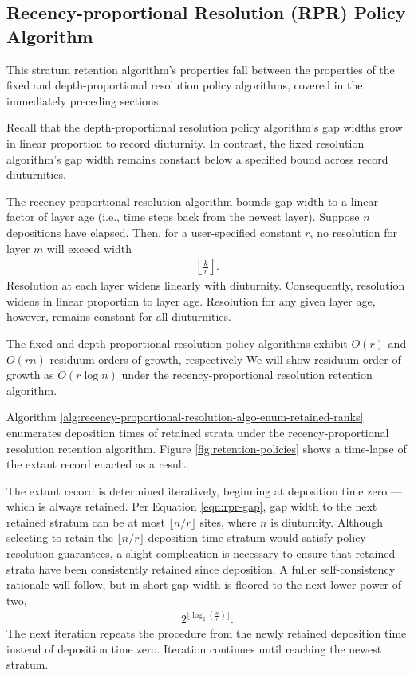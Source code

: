 \subsection{Recency-proportional Resolution (RPR) Policy Algorithm}
\label{sec:recency-proportional-resolution-algo}

This stratum retention algorithm's properties fall between the properties of the fixed and depth-proportional resolution policy algorithms, covered in the immediately preceding sections.

Recall that the depth-proportional resolution policy algorithm's gap widths grow in linear proportion to record diuturnity.
In contrast, the fixed resolution algorithm's gap width remains constant below a specified bound across record diuturnities.

The recency-proportional resolution algorithm bounds gap width to a linear factor of layer age (i.e., time steps back from the newest layer).
Suppose $n$ depositions have elapsed.
Then, for a user-specified constant $r$, no resolution for layer $m$ will exceed width
\begin{align}
  \left\lfloor \frac{k}{r} \right\rfloor.
  \label{eqn:rpr-gap}
\end{align}
Resolution at each layer widens linearly with diuturnity.
Consequently, resolution widens in linear proportion to layer age.
Resolution for any given layer age, however, remains constant for all diuturnities.

The fixed and depth-proportional resolution policy algorithms exhibit $O(r)$ and $O(rn)$ residuum orders of growth, respectively
We will show residuum order of growth as $O(r\log{n})$ under the recency-proportional resolution retention algorithm.

Algorithm \ref{alg:recency-proportional-resolution-algo-enum-retained-ranks} enumerates deposition times of retained strata under the recency-proportional resolution retention algorithm.
Figure \ref{fig:retention-policies} shows a time-lapse of the extant record enacted as a result.

The extant record is determined iteratively, beginning at deposition time zero --- which is always retained.
Per Equation \ref{eqn:rpr-gap}, gap width to the next retained stratum can be at most $\lfloor n/r \rfloor$ sites, where $n$ is diuturnity.
Although selecting to retain the $\lfloor n/r \rfloor$ deposition time stratum would satisfy policy resolution guarantees, a slight complication is necessary to ensure that retained strata have been consistently retained since deposition.
A fuller self-consistency rationale will follow, but in short gap width is floored to the next lower power of two,
\begin{align*}
  2^{\lfloor \log_{2}\left(\frac{n}{r}\right) \rfloor}.
\end{align*}
The next iteration repeats the procedure from the newly retained deposition time instead of deposition time zero.
Iteration continues until reaching the newest stratum.

